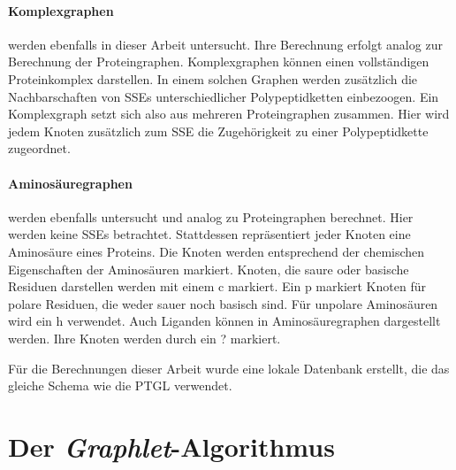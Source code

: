 \documentclass{report}
\begin{document}
\paragraph{Komplexgraphen}

werden ebenfalls in dieser Arbeit untersucht. Ihre Berechnung erfolgt analog zur Berechnung der Proteingraphen. Komplexgraphen k\"onnen einen vollst\"andigen Proteinkomplex darstellen. In einem solchen Graphen werden zus\"atzlich die Nachbarschaften von SSEs unterschiedlicher Polypeptidketten einbezoogen. Ein Komplexgraph setzt sich also aus mehreren Proteingraphen zusammen. Hier wird jedem Knoten zus\"atzlich zum SSE die Zugeh\"origkeit zu einer Polypeptidkette zugeordnet.

\paragraph{Aminos\"auregraphen} werden ebenfalls untersucht und analog zu Proteingraphen berechnet. Hier werden keine SSEs betrachtet. Stattdessen repr\"asentiert jeder Knoten eine Aminos\"aure eines Proteins. Die Knoten werden entsprechend der chemischen Eigenschaften der Aminos\"auren markiert. Knoten, die saure oder basische Residuen darstellen werden mit einem c markiert. Ein p markiert Knoten f\"ur polare Residuen, die weder sauer noch basisch sind. F\"ur unpolare Aminos\"auren wird ein h verwendet. Auch Liganden k\"onnen in Aminos\"auregraphen dargestellt werden. Ihre Knoten werden durch ein ? markiert.


F\"ur die Berechnungen dieser Arbeit wurde eine lokale Datenbank erstellt, die das gleiche Schema wie die PTGL verwendet.

\section{Der \textit{Graphlet}-Algorithmus}
\end{document}
